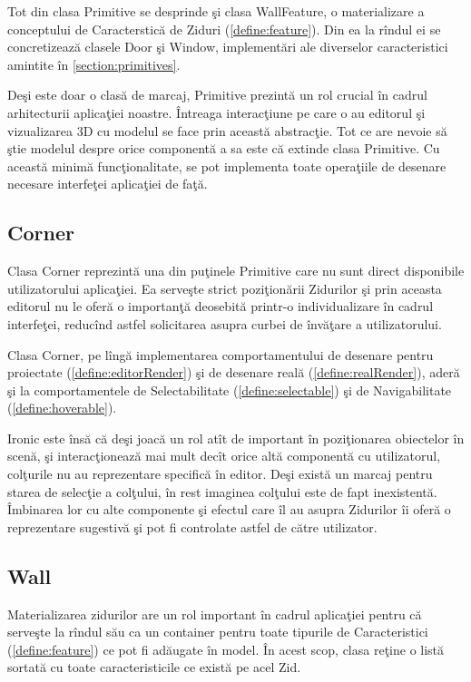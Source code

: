 Tot din clasa Primitive se desprinde şi clasa WallFeature, o materializare a 
conceptului de Caracterstică de Ziduri (\ref{define:feature}). Din ea la rîndul 
ei se concretizează clasele Door şi Window, implementări 
ale diverselor caracteristici amintite în \ref{section:primitives}.

Deşi este doar o clasă de marcaj, Primitive prezintă un rol crucial în cadrul 
arhitecturii aplicaţiei noastre. Întreaga interacţiune pe care o au editorul şi 
vizualizarea 3D cu modelul se face prin această abstracţie. Tot ce are nevoie 
să ştie modelul despre orice componentă a sa este că extinde clasa Primitive. 
Cu această minimă funcţionalitate, se pot implementa toate operaţiile de 
desenare necesare interfeţei aplicaţiei de faţă.

\subsection{Corner}

Clasa Corner reprezintă una din puţinele Primitive care nu sunt direct 
disponibile utilizatorului aplicaţiei. Ea serveşte strict poziţionării 
Zidurilor şi prin aceasta editorul nu le oferă o importanţă deosebită printr-o 
individualizare în cadrul interfeţei, reducînd astfel solicitarea asupra curbei 
de învăţare a utilizatorului.

Clasa Corner, pe lîngă implementarea comportamentului de desenare pentru 
proiectate (\ref{define:editorRender}) şi de desenare reală 
(\ref{define:realRender}), aderă şi la comportamentele de Selectabilitate 
(\ref{define:selectable}) şi de Navigabilitate (\ref{define:hoverable}).

Ironic este însă că deşi joacă un rol atît de important în poziţionarea 
obiectelor în scenă, şi interacţionează mai mult decît orice altă componentă cu 
utilizatorul, colţurile nu au reprezentare specifică în editor. Deşi există un 
marcaj pentru starea de selecţie a colţului, în rest imaginea colţului este de 
fapt inexistentă. Îmbinarea lor cu alte componente şi efectul care îl au asupra
 Zidurilor îi oferă o reprezentare sugestivă şi pot fi controlate astfel de 
către utilizator.

\subsection{Wall}

Materializarea zidurilor are un rol important în cadrul aplicaţiei pentru că 
serveşte la rîndul său ca un container pentru toate tipurile de Caracteristici 
(\ref{define:feature}) ce pot fi adăugate în model. În acest scop, clasa reţine 
o listă sortată cu toate caracteristicile ce există pe acel Zid.


